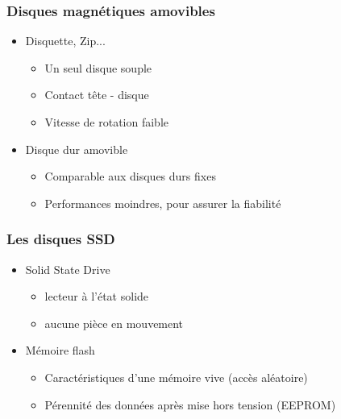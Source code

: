 \begin{frame}
\frametitle{Disques magnétiques amovibles}
\begin{itemize}
\item Disquette, Zip...
\begin{itemize}
\item Un seul disque souple
\item Contact tête - disque
\item Vitesse de rotation faible
\end{itemize}
\item Disque dur amovible
\begin{itemize}
\item Comparable aux disques durs fixes
\item Performances moindres, pour assurer la fiabilité
\end{itemize}
\end{itemize}
\end{frame}


\begin{frame}
\frametitle{Les disques SSD}
\begin{itemize}
\item Solid State Drive
\begin{itemize}
\item lecteur à l'état solide
\item aucune pièce en mouvement
\end{itemize}


\item Mémoire flash
\begin{itemize}
\item Caractéristiques d'une mémoire vive (accès aléatoire)
\item Pérennité des données après mise hors tension (EEPROM)
\end{itemize}
\end{itemize}
\end{frame}


